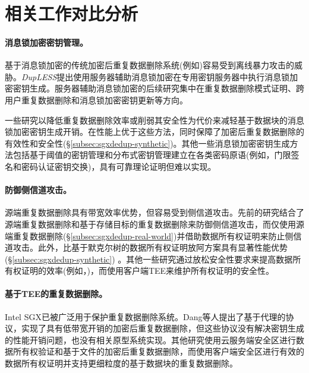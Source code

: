 \section{相关工作对比分析}
\label{sec:sgxdedup-related_work}

\paragraph*{消息锁加密密钥管理。} 基于消息锁加密\cite{bellare2013MLE}的传统加密后重复数据删除系统(例如\cite{adya2002farsite,cox2002pastiche,shah15})容易受到离线暴力攻击\cite{bellare2013DupLESS}的威胁。{\em DupLESS}\cite{bellare2013DupLESS}提出使用服务器辅助消息锁加密在专用密钥服务器中执行消息锁加密密钥生成。服务器辅助消息锁加密的后续研究集中在重复数据删除模式证明\cite{armknecht2015transparent}、跨用户重复数据删除\cite{zhou2015secdep}和消息锁加密密钥更新\cite{qin17}等方向。

一些研究以降低重复数据删除效率\cite{zhou2015secdep,qin17}或削弱其安全性\cite{li2020Info}为代价来减轻基于数据块的消息锁加密密钥生成开销。\sysnameS 在性能上优于这些方法，同时保障了加密后重复数据删除的有效性和安全性(\S\ref{subsec:sgxdedup-synthetic})。其他一些消息锁加密密钥生成方法包括基于阈值的密钥管理\cite{duan2014distributed}和分布式密钥管理\cite{liu2015secure}建立在各类密码原语(例如，门限签名\cite{duan2014distributed}和密码认证密钥交换\cite{liu2015secure})，具有可靠理论证明但难以实现。

\paragraph*{防御侧信道攻击。}源端重复数据删除具有带宽效率优势，但容易受到侧信道攻击\cite{harnik2010side}。先前的研究\cite{harnik2010side, li15}结合了源端重复数据删除和基于存储目标的重复数据删除来防御侧信道攻击，而\sysnameS 仅使用源端重复数据删除(\S\ref{subsec:sgxdedup-real-world})并借助数据所有权证明来防止侧信道攻击。此外，\sysnameS 比基于默克尔树的数据所有权证明放阿方案具有显著性能优势(\S\ref{subsec:sgxdedup-synthetic}) 。其他一些研究通过放松安全性要求来提高数据所有权证明的效率(例如，\cite{pietro12,xu2013weak})，而\sysnameS 使用客户端TEE来维护所有权证明的安全性。

\paragraph*{基于TEE的重复数据删除。} Intel SGX\cite{sgx}已被广泛用于保护重复数据删除系统。Dang等人\cite{dang2017Privacy}提出了基于代理的协议，实现了具有低带宽开销的加密后重复数据删除，但这些协议没有解决密钥生成的性能开销问题，也没有相关原型系统实现。其他研究使用云服务端安全区进行数据所有权验证\cite{you2020Proofs}和基于文件的加密后重复数据删除\cite{fuhry20}，而\sysnameS 使用客户端安全区进行有效的数据所有权证明并支持更细粒度的基于数据块的重复数据删除。

